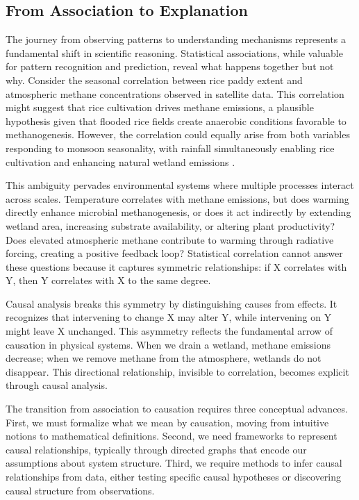 \subsection{From Association to Explanation}

The journey from observing patterns to understanding mechanisms represents a fundamental shift in scientific reasoning. Statistical associations, while valuable for pattern recognition and prediction, reveal what happens together but not why. Consider the seasonal correlation between rice paddy extent and atmospheric methane concentrations observed in satellite data. This correlation might suggest that rice cultivation drives methane emissions, a plausible hypothesis given that flooded rice fields create anaerobic conditions favorable to methanogenesis. However, the correlation could equally arise from both variables responding to monsoon seasonality, with rainfall simultaneously enabling rice cultivation and enhancing natural wetland emissions \cite{patra2016}.

This ambiguity pervades environmental systems where multiple processes interact across scales. Temperature correlates with methane emissions, but does warming directly enhance microbial methanogenesis, or does it act indirectly by extending wetland area, increasing substrate availability, or altering plant productivity? Does elevated atmospheric methane contribute to warming through radiative forcing, creating a positive feedback loop? Statistical correlation cannot answer these questions because it captures symmetric relationships: if X correlates with Y, then Y correlates with X to the same degree.

Causal analysis breaks this symmetry by distinguishing causes from effects. It recognizes that intervening to change X may alter Y, while intervening on Y might leave X unchanged. This asymmetry reflects the fundamental arrow of causation in physical systems. When we drain a wetland, methane emissions decrease; when we remove methane from the atmosphere, wetlands do not disappear. This directional relationship, invisible to correlation, becomes explicit through causal analysis.

The transition from association to causation requires three conceptual advances. First, we must formalize what we mean by causation, moving from intuitive notions to mathematical definitions. Second, we need frameworks to represent causal relationships, typically through directed graphs that encode our assumptions about system structure. Third, we require methods to infer causal relationships from data, either testing specific causal hypotheses or discovering causal structure from observations.

